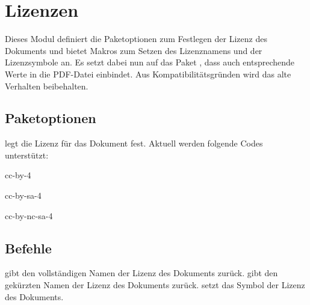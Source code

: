 \section{Lizenzen}
\label{modul:lizenzen}
Dieses Modul definiert die Paketoptionen zum Festlegen der Lizenz des
Dokuments und bietet Makros zum Setzen des Lizenznamens und der
Lizenzsymbole an. Es setzt dabei nun auf das Paket , dass auch entsprechende Werte in die PDF-Datei einbindet. Aus Kompatibilitätsgründen wird das alte Verhalten beibehalten.

\subsection{Paketoptionen}
\begin{options}
		legt die Lizenz für das Dokument fest. Aktuell werden
		folgende Codes unterstützt: \begin{smallitemize}
			\item cc-by-4
			\item cc-by-sa-4
			\item cc-by-nc-sa-4
		\end{smallitemize}
\end{options}

\subsection{Befehle}
\begin{commands}
		gibt den vollständigen Namen der Lizenz des Dokuments zurück.
		gibt den gekürzten Namen der Lizenz des Dokuments zurück.
		setzt das Symbol der Lizenz des Dokuments.

\end{commands}
